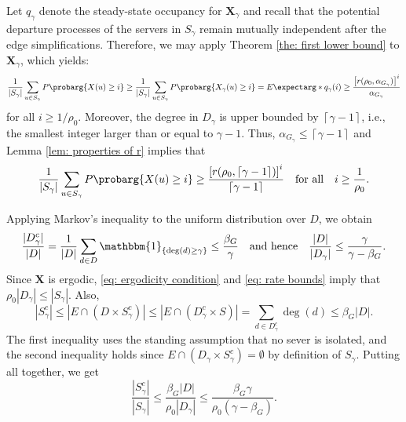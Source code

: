 \documentclass[a4paper, 12pt]{article}
\theoremstyle{definition}
\newcommand{\ind}[1]{\mathbbm{1}_{\left\{#1\right\}}}
\newcommand{\ceil}[1]{\left\lceil#1\right\rceil}
\newcommand{\bX}{\boldsymbol{X}}
\newcommand{\expect}{E\expectarg}
\newcommand{\cprob}{P\probarg}
\begin{document}
Let $q_\gamma$ denote the steady-state occupancy for $\bX_\gamma$ and recall that the potential departure processes of the servers in $S_\gamma$ remain mutually independent after the edge simplifications. Therefore, we may apply Theorem \ref{the: first lower bound} to $\bX_\gamma$, which yields:
\begin{equation*}
	\frac{1}{|S_\gamma|}\sum_{u \in S_\gamma} \cprob{X(u) \geq i} \geq \frac{1}{|S_\gamma|}\sum_{u \in S_\gamma} \cprob{X_\gamma(u) \geq i} = \expect*{q_\gamma(i)} \geq \frac{\left[r(\rho_0, \alpha_{G_\gamma})\right]^i}{\alpha_{G_\gamma}}
\end{equation*}
for all $i \geq 1 / \rho_0$. Moreover, the degree in $D_\gamma$ is upper bounded by $\ceil{\gamma - 1}$, i.e., the smallest integer larger than or equal to $\gamma - 1$. Thus, $\alpha_{G_\gamma} \leq \ceil{\gamma - 1}$ and Lemma \ref{lem: properties of r} implies that
\begin{equation}
	\label{eq: lower bound using ceiling}
	\frac{1}{|S_\gamma|}\sum_{u \in S_\gamma} \cprob{X(u) \geq i} \geq \frac{\left[r(\rho_0, \ceil{\gamma - 1})\right]^i}{\ceil{\gamma - 1}} \quad \text{for all} \quad i \geq \frac{1}{\rho_0}.
\end{equation}

Applying Markov's inequality to the uniform distribution over $D$, we obtain
\begin{equation*}
	\frac{|D_\gamma^c|}{|D|} = \frac{1}{|D|}\sum_{d \in D} \ind{\deg(d) \geq \gamma} \leq \frac{\beta_G}{\gamma} \quad \text{and hence} \quad \frac{|D|}{|D_\gamma|} \leq \frac{\gamma}{\gamma - \beta_G}.
\end{equation*}
Since $\bX$ is ergodic, \eqref{eq: ergodicity condition} and \eqref{eq: rate bounds} imply that $\rho_0 |D_\gamma| \leq |S_\gamma|$. Also,
\begin{equation*}
	\left|S_\gamma^c\right| \leq \left|E \cap \left(D \times S_\gamma^c\right)\right| \leq \left|E \cap \left(D_\gamma^c \times S\right)\right| = \sum_{d \in D_\gamma^c} \deg(d) \leq \beta_G|D|.
\end{equation*}
The first inequality uses the standing assumption that no sever is isolated, and the second inequality holds since $E \cap (D_\gamma \times S_\gamma^c) = \emptyset$ by definition of $S_\gamma$. Putting all together, we get
\begin{equation*}
	\frac{|S_\gamma^c|}{|S_\gamma|} \leq \frac{\beta_G|D|}{\rho_0|D_\gamma|} \leq \frac{\beta_G \gamma}{\rho_0(\gamma - \beta_G)}.
\end{equation*}
\end{document}
